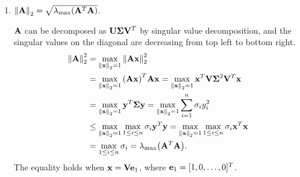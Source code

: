 \begin{enumerate}[label=(\alph*)]
\begin{enumerate}[label=\roman*.]
            \item $\norm{\vb{A}}_2=\sqrt{\lambda_{\max}\qty(\vb{A}^T\vb{A})}$.
                \begin{solution}{}{}
                    $\vb{A}$ can be decomposed as $\vb{U}\vb*{\Sigma}\vb{V}^T$ by singular value decomposition, and the singular values on the diagonal are decreasing from top left to bottom right.
                    \begin{align*}
                        \norm{\vb{A}}_2^2 &= \max_{\norm{\vb{x}}_2=1} \norm{\vb{A}\vb{x}}_2^2 \\
                        &= \max_{\norm{\vb{x}}_2=1} \qty(\vb{A}\vb{x})^T\vb{A}\vb{x} = \max_{\norm{\vb{x}}_2=1}\vb{x}^T\vb{V}\vb*{\Sigma}^2\vb{V}^T\vb{x} \\
                        &= \max_{\norm{\vb{x}}_2=1}\vb{y}^T\vb*{\Sigma}\vb{y} = \max_{\norm{\vb{x}}_2=1}\sum_{i=1}^n\sigma_iy_i^2 \\
                        &\leq \max_{\norm{\vb{x}}_2=1}\max_{1\leq i\leq n}\sigma_i \vb{y}^T\vb{y} = \max_{\norm{\vb{x}}_2=1}\max_{1\leq i\leq n}\sigma_i \vb{x}^T\vb{x}\\
                        &= \max_{1\leq i\leq n}\sigma_i = \lambda_{\max}\qty(\vb{A}^T\vb{A}).
                    \end{align*}
                    The equality holds when $\vb{x}=\vb{V}\vb{e}_1$, where $\vb{e}_1=[1,0,\ldots,0]^T$.
                \end{solution}
        \end{enumerate}
\end{enumerate}



